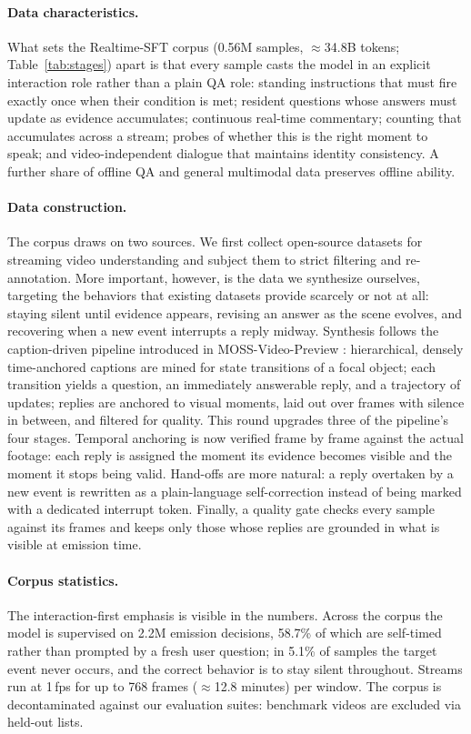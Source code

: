 \paragraph{Data characteristics.}
What sets the Realtime-SFT corpus (0.56M samples, ${\approx}$34.8B
tokens; Table~\ref{tab:stages}) apart is that every sample casts the
model in an explicit interaction role rather than a plain QA role:
standing instructions that must fire exactly once when their condition
is met; resident questions whose answers must update as evidence
accumulates; continuous real-time commentary; counting that accumulates
across a stream; probes of whether this is the right moment to speak;
and video-independent dialogue that maintains identity consistency. A
further share of offline QA and general multimodal data preserves
offline ability.

\paragraph{Data construction.}
The corpus draws on two sources. We first collect open-source datasets
for streaming video understanding and subject them to strict filtering
and re-annotation. More important, however, is the data we synthesize
ourselves, targeting the behaviors that existing datasets provide
scarcely or not at all: staying silent until evidence appears, revising
an answer as the scene evolves, and recovering when a new event
interrupts a reply midway. Synthesis follows the caption-driven pipeline
introduced in MOSS-Video-Preview \citep{Wang2026moss}: hierarchical,
densely time-anchored captions are mined for state transitions of a
focal object; each transition yields a question, an immediately
answerable reply, and a trajectory of updates; replies are anchored to
visual moments, laid out over frames with silence in between, and
filtered for quality. This round upgrades three of the pipeline's four
stages. Temporal anchoring is now verified frame by frame against the
actual footage: each reply is assigned the moment its evidence becomes
visible and the moment it stops being valid. Hand-offs are more
natural: a reply overtaken by a new event is rewritten as a
plain-language self-correction instead of being marked with a dedicated
interrupt token. Finally, a quality gate checks every sample against
its frames and keeps only those whose replies are grounded in what is
visible at emission time.

\paragraph{Corpus statistics.}
The interaction-first emphasis is visible in the numbers. Across the
corpus the model is supervised on 2.2M emission decisions, 58.7\% of
which are self-timed rather than prompted by a fresh user question; in
5.1\% of samples the target event never occurs, and the correct
behavior is to stay silent throughout. Streams run at 1\,fps for up to
768 frames (${\approx}$12.8 minutes) per window. The corpus is
decontaminated against our evaluation suites: benchmark videos are
excluded via held-out lists.

